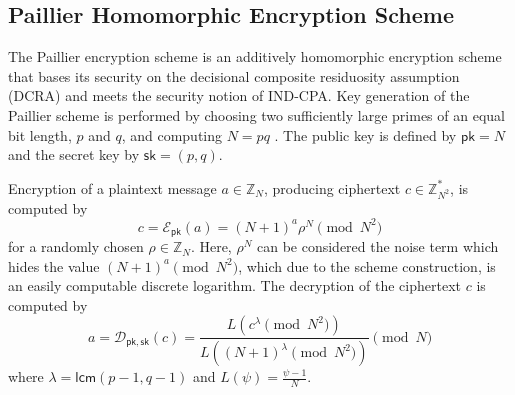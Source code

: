 % 
% 

\subsection{Paillier Homomorphic Encryption Scheme}\label{subsec:prelims:paillier}
The Paillier encryption scheme \cite{paillierPublicKeyCryptosystemsBased1999} is an additively homomorphic encryption scheme that bases its security on the decisional composite residuosity assumption (DCRA) and meets the security notion of IND-CPA. Key generation of the Paillier scheme is performed by choosing two sufficiently large primes of an equal bit length, $p$ and $q$, and computing $N=pq$ \cite{katzIntroductionModernCryptography2008}. The public key is defined by $\mathsf{pk}=N$ and the secret key by $\mathsf{sk}=(p, q)$.

Encryption of a plaintext message $a \in \mathbb{Z}_N$, producing ciphertext $c \in \mathbb{Z}^{*}_{N^2}$, is computed by
\begin{equation}
    c=\mathcal{E}_{\mathsf{pk}}(a) = (N+1)^a \rho^N \pmod{N^2}
\end{equation}
for a randomly chosen $\rho \in \mathbb{Z}_{N}$. Here, $\rho^N$ can be considered the noise term which hides the value $(N+1)^a \pmod{N^2}$, which due to the scheme construction, is an easily computable discrete logarithm. The decryption of the ciphertext $c$ is computed by
\begin{equation}
    a=\mathcal{D}_{\mathsf{pk},\mathsf{sk}}(c) = \frac{L(c^\lambda\pmod{N^2})}{L((N+1)^\lambda\pmod{N^2})} \pmod{N}
\end{equation}
where $\lambda = \mathsf{lcm}(p-1, q-1)$ and $L(\psi) = \frac{\psi-1}{N}$.

